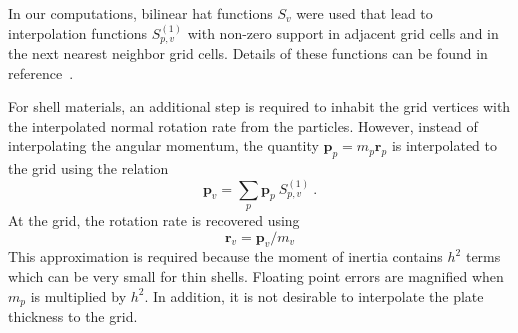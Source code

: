       In our computations, bilinear hat functions $S_v$ were used that 
      lead to interpolation functions $S^{(1)}_{p,v}$ with non-zero support
      in adjacent grid cells and in the next nearest neighbor grid cells.
      Details of these functions can be found in reference~\cite{Bard2000a}.

      For shell materials, an additional step is required to inhabit the 
      grid vertices with the interpolated normal rotation rate from the 
      particles.   However,
      instead of interpolating the angular momentum, the quantity 
      $ \mathbf{p}_p = m_p\mathbf{r}_p$ is interpolated to the grid using the 
      relation
      \begin{equation}
        \mathbf{p}_v = \sum_p \mathbf{p}_p~S^{(1)}_{p,v}~.
      \end{equation}
      At the grid, the rotation rate is recovered using
      \begin{equation}
        \mathbf{r}_v = \mathbf{p}_v / m_v
      \end{equation}
      This approximation is required because the moment of inertia contains
      $h^2$ terms which can be very small for thin shells.  Floating point
      errors are magnified when $m_p$ is multiplied by $h^2$.  In addition,
      it is not desirable to interpolate the plate thickness to the grid.

